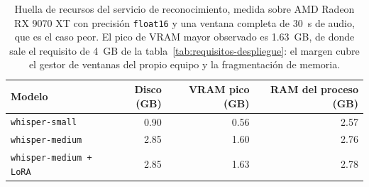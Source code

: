 \begin{table}[H]
\centering
\small
\begin{tabular}{|l|r|r|r|}
    \hline
    \textbf{Modelo} & \textbf{Disco (GB)} & \textbf{VRAM pico (GB)} &
    \textbf{RAM del proceso (GB)} \\
    \hline
    \texttt{whisper-small} & 0.90 & 0.56 & 2.57 \\
    \texttt{whisper-medium} & 2.85 & 1.60 & 2.76 \\
    \texttt{whisper-medium + LoRA} & 2.85 & 1.63 & 2.78 \\
    \hline
\end{tabular}
\caption{Huella de recursos del servicio de reconocimiento, medida sobre
AMD Radeon RX 9070 XT con precisión \texttt{float16} y una ventana completa de 30~s de audio, que
es el caso peor. El pico de VRAM mayor observado es 1.63~GB, de donde sale el
requisito de 4~GB de la tabla~\ref{tab:requisitos-despliegue}: el margen cubre el
gestor de ventanas del propio equipo y la fragmentación de memoria.}
\label{tab:huella}
\end{table}

